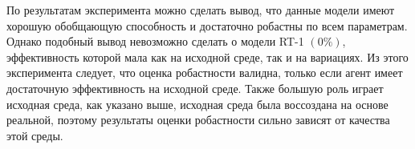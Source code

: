             \begin{table}[ht]
              \caption{Результаты валидации моделей RT-1 на задаче взятия банки}
              \label{res-Table2}
              
            \end{table}

            По результатам эксперимента можно сделать вывод, что данные модели имеют хорошую обобщающую способность и достаточно робастны по всем параметрам. Однако подобный вывод невозможно сделать о модели RT-1 $(0\%)$, эффективность которой мала как на исходной среде, так и на вариациях. Из этого эксперимента следует, что оценка робастности валидна, только если агент имеет достаточную эффективность на исходной среде. Также большую роль играет исходная среда, как указано выше, исходная среда была воссоздана на основе реальной, поэтому результаты оценки робастности сильно зависят от качества этой среды.

